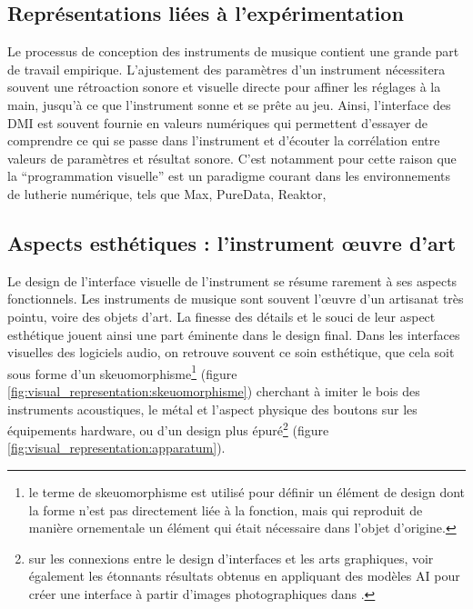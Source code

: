 \subsection{Représentations liées à l'expérimentation}

\noindent Le processus de conception des instruments de musique contient une grande part de travail empirique. L'ajustement des paramètres d'un instrument nécessitera souvent une rétroaction sonore et visuelle directe pour affiner les réglages à la main, jusqu'à ce que l'instrument sonne et se prête au jeu. Ainsi, l'interface des \gls{DMI} est souvent fournie en valeurs numériques qui permettent d'essayer de comprendre ce qui se passe dans l'instrument et d'écouter la corrélation entre valeurs de paramètres et résultat sonore. C'est notamment pour cette raison que la ``programmation visuelle'' est un paradigme courant dans les environnements de lutherie numérique, tels que Max, PureData, Reaktor, 

\subsection{Aspects esthétiques : l'instrument œuvre d'art}

\noindent Le design de l'interface visuelle de l'instrument se résume rarement à ses aspects fonctionnels. Les instruments de musique sont souvent l'œuvre d'un artisanat très pointu, voire des objets d'art. La finesse des détails et le souci de leur aspect esthétique jouent ainsi une part éminente dans le design final. Dans les interfaces visuelles des logiciels audio, on retrouve souvent ce soin esthétique, que cela soit sous forme d'un skeuomorphisme\footnote{le terme de skeuomorphisme est utilisé pour définir un élément de design dont la forme n'est pas directement liée à la fonction, mais qui reproduit de manière ornementale un élément qui était nécessaire dans l'objet d'origine.} (figure \ref{fig:visual_representation:skeuomorphisme}) cherchant à imiter le bois des instruments acoustiques, le métal et l'aspect physique des boutons sur les équipements hardware, ou d'un design plus épuré\footnote{sur les connexions entre le design d'interfaces et les arts graphiques, voir également les étonnants résultats obtenus en appliquant des modèles AI pour créer une interface à partir d'images photographiques dans \cite{troyer_mondrian_2019}.}  (figure \ref{fig:visual_representation:apparatum}).

